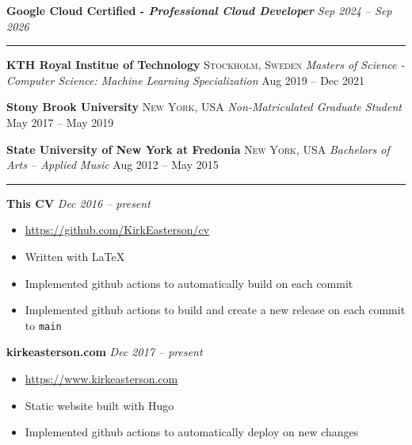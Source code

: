 \documentclass[10pt,letterpaper]{article}
\begin{document}

\headedsection
{\textbf{Google Cloud Certified - \textit{Professional Cloud Developer}}}
{\textit{Sep 2024 -- Sep 2026}} {}
\begin{center}\hrule\end{center}



\headedsection
{\textbf{KTH Royal Institue of Technology}}
{\textsc{Stockholm, Sweden}} {
	\indentedsubsection
	{\textit{Masters of Science - Computer Science: Machine Learning Specialization}}
	{Aug 2019 -- Dec 2021}
	{}
}

\headedsection
{\textbf{Stony Brook University}}
{\textsc{New York, USA}} {
	\indentedsubsection
	{\textit{Non-Matriculated Graduate Student}}
	{May 2017 -- May 2019}
	{}
}

\headedsection
{\textbf{State University of New York at Fredonia}}
{\textsc{New York, USA}} {
	\indentedsubsection
	{\textit{Bachelors of Arts -- Applied Music}}
	{Aug 2012 -- May 2015}
	{}
}
\begin{center}\hrule\end{center}


\headedsection
{\textbf{This CV}}
{\textit{Dec 2016 -- present}} {
	\begin{itemize}[noitemsep,nolistsep]
		\item \url{https://github.com/KirkEasterson/cv}
		\item Written with \LaTeX
		\item Implemented github actions to automatically build on each commit
		\item Implemented github actions to build and create a new release on each commit to \texttt{main}
	\end{itemize}
}

\headedsection
{\textbf{kirkeasterson.com}}
{\textit{Dec 2017 -- present}} {
	\begin{itemize}[noitemsep,nolistsep]
		\item \url{https://www.kirkeasterson.com}
		\item Static website built with Hugo
		\item Implemented github actions to automatically deploy on new changes
	\end{itemize}
}
\end{document}
